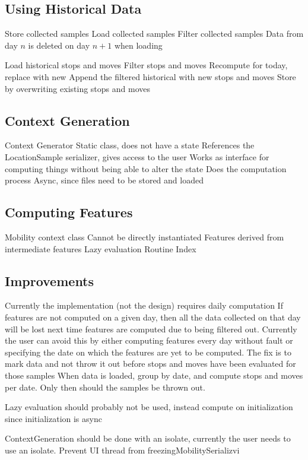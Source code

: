 \subsection{Using Historical Data}
Store collected samples
Load collected samples
Filter collected samples
Data from day $n$ is deleted on day $n+1$ when loading

Load historical stops and moves
Filter stops and moves
Recompute for today, replace with new 
Append the filtered historical with new stops and moves
Store by overwriting existing stops and moves

\subsection{Context Generation}
Context Generator
Static class, does not have a state
References the LocationSample serializer, gives access to the user
Works as interface for computing things without being able to alter the state
Does the computation process
Async, since files need to be stored and loaded


\subsection{Computing Features}
Mobility context class
Cannot be directly instantiated
Features derived from intermediate features
Lazy evaluation
Routine Index

\subsection{Improvements}
Currently the implementation (not the design) requires daily computation
If features are not computed on a given day, then all the data collected on that day will be lost next time features are computed due to being filtered out. Currently the user can avoid this by either computing features every day without fault or specifying the date on which the features are yet to be computed.
The fix is to mark data and not throw it out before stops and moves have been evaluated for those samples
When data is loaded, group by date, and compute stops and moves per date. Only then should the samples be thrown out.

Lazy evaluation should probably not be used, instead compute on initialization since initialization is async

ContextGeneration should be done with an isolate, currently the user needs to use an isolate.
Prevent UI thread from freezingMobilitySerializvi